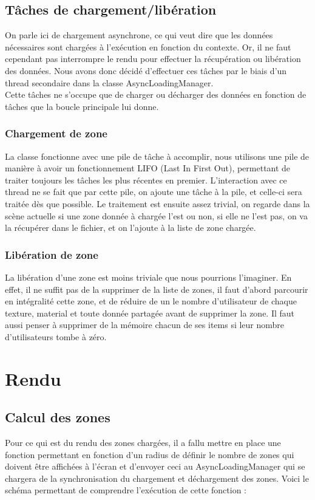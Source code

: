 \documentclass{report}
\begin{document}
		\subsection{Tâches de chargement/libération}
			On parle ici de chargement asynchrone, ce qui veut dire que les données nécessaires sont chargées à l'exécution en fonction du contexte. Or, il ne faut cependant pas interrompre le rendu pour effectuer la récupération ou libération des données. Nous avons donc décidé d'effectuer ces tâches par le biais d'un thread secondaire dans la classe AsyncLoadingManager.\\

Cette tâches ne s'occupe que de charger ou décharger des données en fonction de tâches que la boucle principale lui donne.
			\subsubsection{Chargement de zone}
				La classe fonctionne avec une pile de tâche à accomplir, nous utilisons une pile de manière à avoir un fonctionnement LIFO (Last In First Out), permettant de traiter toujours les tâches les plus récentes en premier. L'interaction avec ce thread ne se fait que par cette pile, on ajoute une tâche à la pile, et celle-ci sera traitée dès que possible.
				Le traitement est ensuite assez trivial, on regarde dans la scène actuelle si une zone donnée à chargée l'est ou non, si elle ne l'est pas, on va la récupérer dans le fichier, et on l'ajoute à la liste de zone chargée.
			\subsubsection{Libération de zone}
			La libération d'une zone est moins triviale que nous pourrions l'imaginer. En effet, il ne suffit pas de la supprimer de la liste de zones, il faut d'abord parcourir en intégralité cette zone, et de réduire de un le nombre d'utilisateur de chaque texture, material et toute donnée partagée avant de supprimer la zone.
Il faut aussi penser à supprimer de la mémoire chacun de ses items si leur nombre d'utilisateurs tombe à zéro.
\newpage				
		\section{Rendu}
		\subsection{Calcul des zones}
			Pour ce qui est du rendu des zones chargées, il a fallu mettre en place une fonction permettant en fonction d'un radius de définir le nombre de zones qui doivent être affichées à l'écran et d'envoyer ceci au AsyncLoadingManager qui se chargera de la synchronisation du chargement et déchargement des zones. Voici le schéma permettant de comprendre l'exécution de cette fonction : 
			
\end{document}
